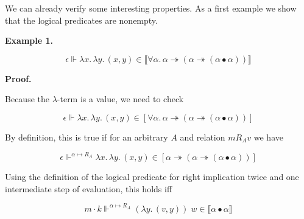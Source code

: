  
 
We can already verify some interesting properties. As a first example we show that the logical predicates are nonempty.\par
 
 
 
\par\medskip\noindent\textbf{Example 1.}\par
 
  
\par  \quad  \[\epsilon\Vdash\lambda x.\,\lambda y.\,(x,y)\in\llbracket\forall\alpha.\,\alpha\twoheadrightarrow(\alpha\twoheadrightarrow(\alpha\bullet\alpha))\rrbracket\]\quad  \quad  
  
 
 
 
\par\medskip\noindent\textbf{Proof.}\par
 
 
Because the $\lambda$-term is a value, we need to check\par
  
\par  \quad  \[\epsilon\Vdash\lambda x.\,\lambda y.\,(x,y)\in[\forall\alpha.\,\alpha\twoheadrightarrow(\alpha\twoheadrightarrow(\alpha\bullet\alpha))]\]\quad  \quad  
  
By definition, this is true if for an arbitrary $A$ and relation $m\mathrel{R_{A}}v$ we have\par
  
\par  \quad  \[\epsilon\Vdash^{\alpha\mapsto R_{A}}\lambda x.\,\lambda y.\,(x,y)\in[\alpha\twoheadrightarrow(\alpha\twoheadrightarrow(\alpha\bullet\alpha))]\]\quad  \quad  
  
Using the definition of the logical predicate for right implication twice and one intermediate step of evaluation, this holds iff\par
  
\par  \quad  \[m\cdot k\Vdash^{\alpha\mapsto R_{A}}(\lambda y.\,(v,y))\;w\in\llbracket\alpha\bullet\alpha\rrbracket\]\quad  \quad  
  
